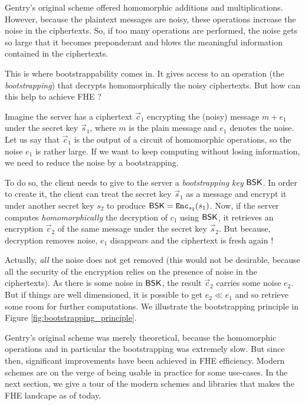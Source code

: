 Gentry's original scheme offered homomorphic additions and multiplications. However, because the plaintext messages are noisy, these operations increase the noise in the ciphertexts. So, if too many operations are performed, the noise gets so large that it becomes preponderant and blows the meaningful information contained in the ciphertexts.

This is where bootstrappability comes in. It gives access to an operation (the \textit{bootstrapping}) that decrypts homomorphically the noisy ciphertexts. But how can this help to achieve FHE ?

Imagine the server has a ciphertext $\vec c_1$ encrypting the (noisy) message $m +e_1$ under the secret key $\vec s_1$, where $m$ is the plain message and $e_1$ denotes the noise. Let us say that $\vec c_1$ is the output of a circuit of homomorphic operations, so the noise $e_1$ is rather large. If we want to keep computing without losing information, we need to reduce the noise by a bootstrapping. 

To do so, the client needs to give to the server a \textit{bootstrapping key} $\textsf{BSK}$. In order to create it, the client can treat the secret key $\vec s_1$ as a message and encrypt it under another secret key $s_2$ to produce $\textsf{BSK} = \texttt{Enc}_{s_2}(s_1)$. Now, if the server computes \textit{homomorphically} the decryption of $c_1$ using $\textsf{BSK}$, it retrieves an encryption $\vec c_2$ of the same message under the secret key $\vec s_2$. But because, decryption removes noise, $e_1$ disappears and the ciphertext is fresh again !

Actually, \textit{all} the noise does not get removed (this would not be desirable, because all the security of the encryption relies on the presence of noise in the ciphertexts). As there is some noise in $\textsf{BSK}$, the result $\vec c_2$ carries some noise $e_2$. But if things are well dimensioned, it is possible to get $e_2 \ll e_1$ and so retrieve some room for further computations. We illustrate the bootstrapping principle in Figure \ref{fig:bootstrapping_principle}.


Gentry's original scheme was merely theoretical, because the homomorphic operations and in particular the bootstrapping was extremely slow. But since then, significant improvements have been achieved in FHE efficiency. Modern schemes are on the verge of being usable in practice for some use-cases. In the next section, we give a tour of the modern schemes and libraries that makes the FHE landcape as of today.



